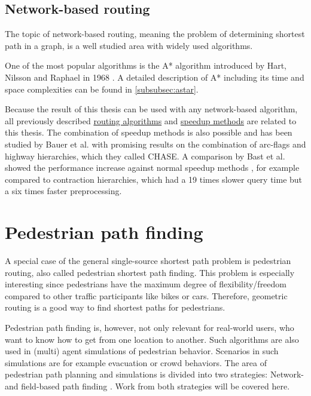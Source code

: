 	\subsection{Network-based routing}
	
		The topic of network-based routing, meaning the problem of determining shortest path in a graph, is a well studied area with widely used algorithms.
		
		One of the most popular algorithms is the A* algorithm introduced by Hart, Nilsson and Raphael in 1968 \cite{astar}.
		A detailed description of A* including its time and space complexities can be found in \cref{subsubsec:astar}.

		Because the result of this thesis can be used with any network-based algorithm, all previously described \hyperref[subsec:routing-engines]{routing algorithms} and \hyperref[subsec:speedup-methods]{speedup methods} are related to this thesis.
		The combination of speedup methods is also possible and has been studied by Bauer et al. \cite{bauer-combining-speedup-methods} with promising results on the combination of arc-flags and highway hierarchies, which they called CHASE.
		A comparison by Bast et al. showed the performance increase against normal speedup methods \cite{bast-transportation-networks}, for example compared to contraction hierarchies, which had a 19 times slower query time but a six times faster preprocessing.

\section{Pedestrian path finding}
\label{sec:pedestrian-path-planning}
	
	A special case of the general single-source shortest path problem is pedestrian routing, also called pedestrian shortest path finding.
	This problem is especially interesting since pedestrians have the maximum degree of flexibility/freedom compared to other traffic participants like bikes or cars.
	Therefore, geometric routing is a good way to find shortest paths for pedestrians.
	
	Pedestrian path finding is, however, not only relevant for real-world users, who want to know how to get from one location to another.
	Such algorithms are also used in (multi) agent simulations of pedestrian behavior.
	Scenarios in such simulations are for example evacuation or crowd behaviors.
	The area of pedestrian path planning and simulations is divided into two strategies: Network- and field-based path finding \cite{hartmann-geodesic}.
	Work from both strategies will be covered here.
	

